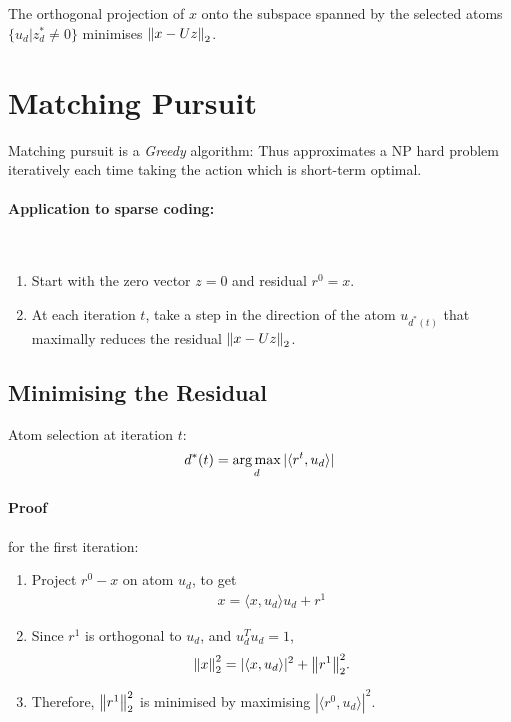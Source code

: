 The orthogonal projection of $x$ onto the subspace spanned by the selected atoms $\{u_d| z_d^* \neq 0\}$ minimises $\left\lVert x-Uz\right\rVert_2$.

\section{Matching Pursuit}
Matching pursuit is a \emph{Greedy} algorithm: Thus approximates a NP hard problem iteratively each time taking the action which is short-term optimal.

\paragraph{Application to sparse coding:}$\ $
\begin{enumerate}
    \item Start with the zero vector $z=0$ and residual $r^0 = x$.
    \item At each iteration $t$, take a step in the direction of the atom $u_{d^*(t)}$ that maximally reduces the residual $\left\lVert x-Uz\right\rVert_2$.
\end{enumerate}

\subsection{Minimising the Residual}
Atom selection at iteration $t$:
\begin{align*}
    d^{*} (t) = \operatorname*{arg\,max}_d |\langle r^t, u_d\rangle|
\end{align*}

\paragraph{Proof} for the first iteration:
\begin{enumerate}
    \item Project $r^0 - x$ on atom $u_d$, to get
        \begin{align*}
            x = \langle x,u_d\rangle u_d + r^1
        \end{align*}
    \item Since $r^1$ is orthogonal to $u_d$, and $u_d^T u_d = 1$,
        \begin{align*}
            \norm{x}_2^2 = |\langle x,u_d\rangle|^2 + \norm{r^1}_2^2.
        \end{align*}
    \item Therefore, $\left\lVert r^1\right\rVert_2^2$ is minimised by maximising $|\langle r^0, u_d\rangle|^2$.
\end{enumerate}



